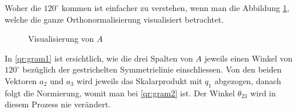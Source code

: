 Woher die $120^\circ$ kommen ist einfacher zu verstehen, wenn man die Abbildung \ref{qr:gram}, welche die ganze Orthonormalisierung visualisiert betrachtet.
\begin{figure}[ht]
	\centering
	\caption{Visualisierung von $A$\label{qr:gram}}
\end{figure}
In \ref{qr:gram1} ist ersichtlich, wie die drei Spalten von $A$ jeweils einen Winkel von $120^\circ$ bezüglich der gestrichelten Symmetrielinie einschliessen.
Von den beiden Vektoren $a_2$ und $a_3$ wird jeweils das Skalarprodukt mit $q_1$ abgezogen, danach folgt die Normierung, womit man bei \ref{qr:gram2} ist.
Der Winkel $\theta_{23}$ wird in diesem Prozess nie verändert.